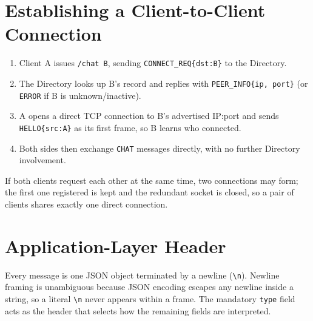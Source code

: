 \documentclass[11pt]{article}
\begin{document}
\section{Establishing a Client-to-Client Connection}
\begin{enumerate}
  \item Client A issues \texttt{/chat B}, sending \texttt{CONNECT\_REQ\{dst:B\}}
        to the Directory.
  \item The Directory looks up B's record and replies with
        \texttt{PEER\_INFO\{ip, port\}} (or \texttt{ERROR} if B is unknown/inactive).
  \item A opens a direct TCP connection to B's advertised IP:port and sends
        \texttt{HELLO\{src:A\}} as its first frame, so B learns who connected.
  \item Both sides then exchange \texttt{CHAT} messages directly, with no further
        Directory involvement.
\end{enumerate}
If both clients request each other at the same time, two connections may form;
the first one registered is kept and the redundant socket is closed, so a pair
of clients shares exactly one direct connection.

\begin{center}
\end{center}

\section{Application-Layer Header}
Every message is one JSON object terminated by a newline (\texttt{\textbackslash n}).
Newline framing is unambiguous because JSON encoding escapes any newline inside a
string, so a literal \texttt{\textbackslash n} never appears within a frame. The
mandatory \texttt{type} field acts as the header that selects how the remaining
fields are interpreted.
\end{document}
